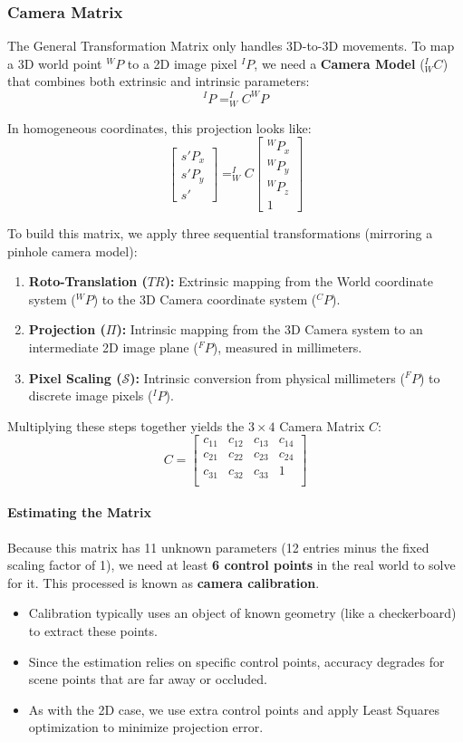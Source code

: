 \subsubsection{Camera Matrix}
The General Transformation Matrix only handles 3D-to-3D movements.
To map a 3D world point $^WP$ to a 2D image pixel $^IP$, we need a \textbf{Camera Model} ($^I_WC$) that combines both extrinsic and intrinsic parameters:
$$ ^IP = ^I_WC ^WP $$

In homogeneous coordinates, this projection looks like:
$$ \begin{bmatrix}
s' P_x \\ s' P_y \\ s'
\end{bmatrix} =
^I_WC \begin{bmatrix}
^WP_x \\ ^WP_y \\ ^WP_z \\ 1
\end{bmatrix} $$

To build this matrix, we apply three sequential transformations (mirroring a pinhole camera model):
\begin{enumerate}
    \item \textbf{Roto-Translation ($TR$):} Extrinsic mapping from the World coordinate system ($^WP$) to the 3D Camera coordinate system ($^CP$).
    \item \textbf{Projection ($\Pi$):} Intrinsic mapping from the 3D Camera system to an intermediate 2D image plane ($^FP$), measured in millimeters.
    \item \textbf{Pixel Scaling ($\mathcal{S}$):} Intrinsic conversion from physical millimeters ($^FP$) to discrete image pixels ($^IP$).
\end{enumerate}

Multiplying these steps together yields the $3 \times 4$ Camera Matrix $C$:
$$ C = \begin{bmatrix}
c_{11} & c_{12} & c_{13} & c_{14} \\
c_{21} & c_{22} & c_{23} & c_{24} \\
c_{31} & c_{32} & c_{33} & 1 \\
\end{bmatrix} $$

\paragraph{Estimating the Matrix}
Because this matrix has 11 unknown parameters (12 entries minus the fixed scaling factor of 1), we need at least \textbf{6 control points} in the real world to solve for it.
This processed is known as \textbf{camera calibration}. 
\begin{itemize}
    \item Calibration typically uses an object of known geometry (like a checkerboard) to extract these points.
    \item Since the estimation relies on specific control points, accuracy degrades for scene points that are far away or occluded. 
    \item As with the 2D case, we use extra control points and apply Least Squares optimization to minimize projection error.
\end{itemize}

